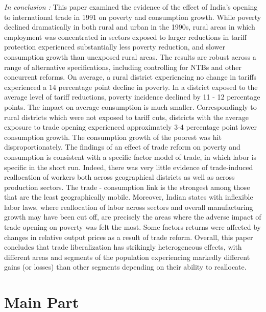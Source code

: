 \documentclass[a4paper,12pt]{article}
\begin{document}
\textit{In conclusion : }This paper examined the evidence of the effect of India's opening to international trade in 1991 on poverty and consumption growth.  While poverty declined dramatically in both rural and urban in the 1990s,  rural areas in which employment was concentrated in sectors exposed to larger reductions in tariff protection experienced substantially less poverty reduction, and slower consumption growth than unexposed rural areas. The results are robust across a range of alternative specifications, including controlling for NTBs and other concurrent reforms. On average, a rural district experiencing no change in tariffs experienced a 14 percentage point decline in poverty.  In a district exposed to the average level of tariff reductions, poverty incidence declined by 11 - 12 percentage points. The impact on average consumption is much smaller. Correspondingly to rural districts which were not exposed to tariff cuts, districts with the average exposure to trade opening experienced approximately 3-4 percentage point lower consumption growth. The consumption growth of the poorest was hit disproportionately.  The findings of an effect of trade reform on poverty and consumption is consistent with a specific factor model of trade, in which labor is specific in the short run. Indeed, there was  very little evidence of trade-induced reallocation of workers both across geographical districts as well as across production sectors. The trade - consumption link is the strongest among those that are the least geographically mobile. Moreover,  Indian states with inflexible labor laws, where reallocation of labor across sectors and overall manufacturing growth may have been cut off, are precisely the areas where the adverse impact of trade opening on poverty was felt the most.  Some factors returns were affected by changes in relative output prices as a result  of trade reform.  
Overall, this paper concludes that  trade liberalization has strikingly heterogeneous effects, with different areas and segments of the population experiencing markedly different gains (or losses) than other segments depending on their ability to reallocate.  

\section{Main Part}
\end{document}
